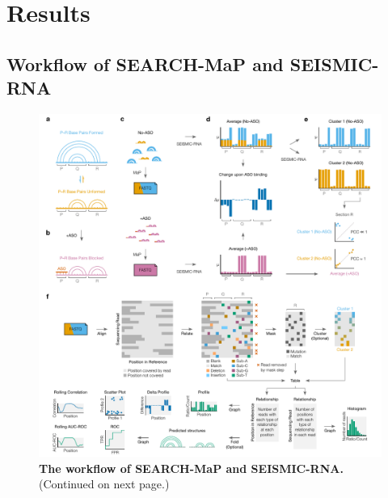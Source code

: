 \documentclass[main.tex]{subfiles}
\begin{document}
\section{Results}

\subsection{Workflow of SEARCH-MaP and SEISMIC-RNA}


\begin{figure}[H]
	\includegraphics[width=\textwidth]{../MainFigures/wf/wf.pdf}
	\caption{\textbf{The workflow of SEARCH-MaP and SEISMIC-RNA.} (Continued on next page.)}
	\label{strat}
\end{figure}
\addtocounter{figure}{-1}
\end{document}
